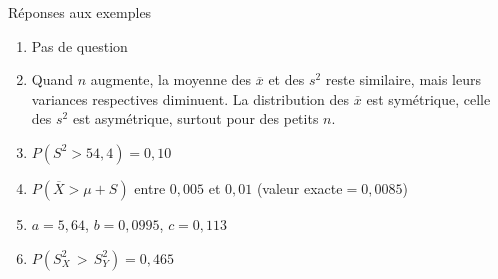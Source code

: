 \documentclass{BeamerTemplate}
\begin{document}

\begin{frame}[t]{Réponses aux exemples}

{\scriptsize
\begin{enumerate}
  \item Pas de question
  \item Quand $n$ augmente, la moyenne des $\overline x$ et des $s^2$ reste similaire, mais leurs variances respectives diminuent. La distribution des $\overline x$ est symétrique, celle des $s^2$ est asymétrique, surtout pour des petits $n$.
  \item $P(S^2>54,4)=0,10$
  \item $P(\overline X>\mu+S)$ entre $0,005$ et $0,01$ (valeur exacte$=0,0085$)
  \item $a=5,64$, $b=0,0995$, $c=0,113$
  \item $P(S^2_X \,>\,S^2_Y)=0,465$
 \end{enumerate}
 }
\end{frame}
\end{document}

